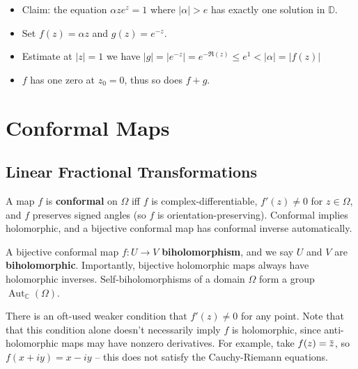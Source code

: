\begin{example}

\envlist

\begin{itemize}
\tightlist
\item
  Claim: the equation \(\alpha z e^z = 1\) where
  \({\left\lvert {\alpha} \right\rvert} > e\) has exactly one solution
  in \({\mathbb{D}}\).
\item
  Set \(f(z) = \alpha z\) and \(g(z) = e^{-z}\).
\item
  Estimate at \({\left\lvert {z} \right\rvert} =1\) we have
  \({\left\lvert {g} \right\rvert} ={\left\lvert {e^{-z}} \right\rvert} = e^{-\Re(z)} \leq e^1 < {\left\lvert {\alpha} \right\rvert} = {\left\lvert {f(z)} \right\rvert}\)
\item
  \(f\) has one zero at \(z_0 = 0\), thus so does \(f+g\).
\end{itemize}

\end{example}

\hypertarget{conformal-maps}{%
\section{Conformal Maps}\label{conformal-maps}}

\hypertarget{linear-fractional-transformations}{%
\subsection{Linear Fractional
Transformations}\label{linear-fractional-transformations}}

\begin{definition}

A map \(f\) is \textbf{conformal} on \(\Omega\) iff \(f\) is
complex-differentiable, \(f'(z)\neq 0\) for \(z\in \Omega\), and \(f\)
preserves signed angles (so \(f\) is orientation-preserving). Conformal
implies holomorphic, and a bijective conformal map has conformal inverse
automatically.

A bijective conformal map \(f:U\to V\) \textbf{biholomorphism}, and we
say \(U\) and \(V\) are \textbf{biholomorphic}. Importantly, bijective
holomorphic maps always have holomorphic inverses. Self-biholomorphisms
of a domain \(\Omega\) form a group
\(\mathop{\mathrm{Aut}}_{\mathbb{C}}(\Omega)\).

\end{definition}

\begin{remark}

There is an oft-used weaker condition that \(f'(z) \neq 0\) for any
point. Note that that this condition alone doesn't necessarily imply
\(f\) is holomorphic, since anti-holomorphic maps may have nonzero
derivatives. For example, take
\(f(z) = \mkern 1.5mu\overline{\mkern-1.5muz\mkern-1.5mu}\mkern 1.5mu\),
so \(f(x+iy) = x-iy\) -- this does not satisfy the Cauchy-Riemann
equations.

\end{remark}

